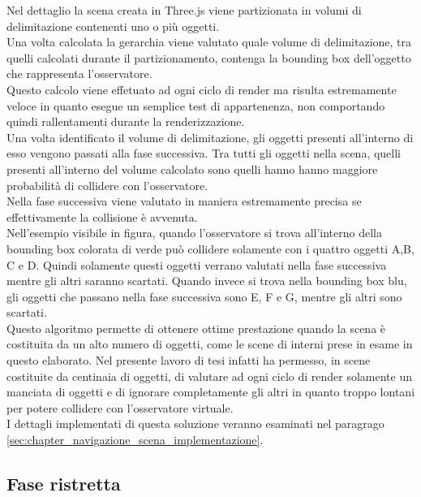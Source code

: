 Nel dettaglio la scena creata in Three.js viene partizionata in volumi di delimitazione contenenti uno o più oggetti.
\\
Una volta calcolata la gerarchia viene valutato quale volume di delimitazione, tra quelli calcolati durante il partizionamento, contenga la  bounding box dell’oggetto che rappresenta l’osservatore.
\\
Questo calcolo viene effetuato ad ogni ciclo di render ma risulta estremamente veloce in quanto esegue un semplice test di appartenenza, non comportando quindi rallentamenti durante la renderizzazione.
\\
Una volta identificato il volume di delimitazione, gli oggetti presenti all’interno di esso vengono passati alla fase successiva. Tra tutti gli oggetti nella scena, quelli presenti all’interno del volume calcolato sono quelli hanno hanno maggiore probabilità di collidere con l’osservatore.
\\
Nella fase successiva viene valutato in maniera estremamente precisa se effettivamente la collisione è avvenuta.
\\
Nell’esempio visibile in figura, quando l’osservatore si trova all’interno della bounding box colorata di verde può collidere solamente con i quattro oggetti A,B, C e D. Quindi solamente questi oggetti verrano valutati nella fase successiva mentre gli altri saranno scartati.
Quando invece si trova nella bounding box blu, gli oggetti che passano nella fase successiva sono E, F e G, mentre gli altri sono scartati.
\\
Questo algoritmo permette di ottenere ottime prestazione quando la scena è costituita da un alto numero di oggetti, come le scene di interni prese in esame in questo elaborato.
Nel presente lavoro di tesi infatti ha permesso, in scene costituite da centinaia di oggetti, di valutare ad ogni ciclo di render solamente un manciata di oggetti e di ignorare completamente gli altri in quanto troppo lontani per potere collidere con l’osservatore virtuale.
\\
I dettagli implementati di questa soluzione veranno esaminati nel paragrago \ref{sec:chapter_navigazione_scena_implementazione}.

\subsection{Fase ristretta}

